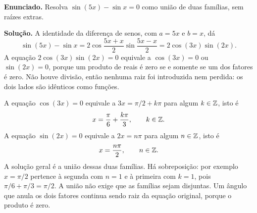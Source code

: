 \documentclass[11pt,a4paper]{article}
\begin{document}
\textbf{Enunciado.} Resolva $\sin(5x)-\sin x=0$ como união de duas famílias, sem raízes extras.

\textbf{Solução.}
A identidade da diferença de senos, com $a=5x$ e $b=x$, dá
\[
\sin(5x)-\sin x
=2\cos\frac{5x+x}{2}\sin\frac{5x-x}{2}
=2\cos(3x)\sin(2x).
\]
A equação $2\cos(3x)\sin(2x)=0$ equivale a $\cos(3x)=0$ ou $\sin(2x)=0$, porque um produto de reais é zero se e somente se um dos fatores é zero. Não houve divisão, então nenhuma raiz foi introduzida nem perdida: os dois lados são idênticos como funções.

A equação $\cos(3x)=0$ equivale a $3x=\pi/2+k\pi$ para algum $k\in\mathbb{Z}$, isto é
\[
x=\frac{\pi}{6}+\frac{k\pi}{3},\qquad k\in\mathbb{Z}.
\]
A equação $\sin(2x)=0$ equivale a $2x=n\pi$ para algum $n\in\mathbb{Z}$, isto é
\[
x=\frac{n\pi}{2},\qquad n\in\mathbb{Z}.
\]
A solução geral é a união dessas duas famílias. Há sobreposição: por exemplo $x=\pi/2$ pertence à segunda com $n=1$ e à primeira com $k=1$, pois $\pi/6+\pi/3=\pi/2$. A união não exige que as famílias sejam disjuntas. Um ângulo que anula os dois fatores continua sendo raiz da equação original, porque o produto é zero.
\end{document}
